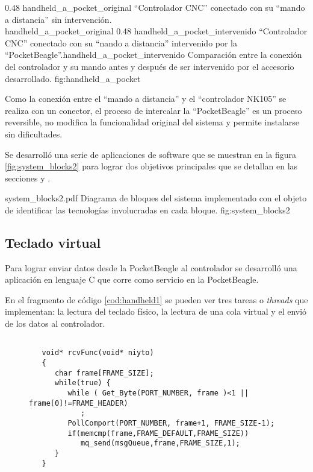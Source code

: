 \subfigab 
   {0.48} {handheld_a_pocket_original} { ``Controlador CNC'' conectado con su ``mando a distancia'' sin intervención.\\ \vphantom{1}}{handheld_a_pocket_original}
   {0.48} {handheld_a_pocket_intervenido} {``Controlador CNC'' conectado con su ``nando a distancia'' intervenido por la\\ ``PocketBeagle''.}{handheld_a_pocket_intervenido}
   {Comparación entre la conexión del controlador y su mando antes y después de ser intervenido por el accesorio desarrollado.}
   {fig:handheld_a_pocket}

         Como la conexión entre el ``mando a distancia'' y el ``controlador NK105'' se realiza con un conector, el proceso de intercalar la ``PocketBeagle'' es un proceso reversible, no modifica la funcionalidad original del sistema y permite instalarse sin dificultades.\par

   Se desarrolló una serie de aplicaciones de software que se muestran en la figura \ref{fig:system_blocks2} para lograr dos objetivos principales que se detallan en las secciones \label{subsection:teclado_virtual} y \label{subsection:pantalla_virtial}.

         {system_blocks2.pdf}
         {Diagrama de bloques del sistema implementado con el objeto de identificar las tecnologías involucradas en cada bloque.}
         {fig:system_blocks2}

\subsection{Teclado virtual}
\label{subsection:teclado_virtual}

      Para lograr enviar datos desde la PocketBeagle al controlador se desarrolló una aplicación en lenguaje C que corre como servicio en la PocketBeagle.\par
      En el fragmento de código \ref{cod:handheld1} se pueden ver tres tareas o \textit{threads} que implementan: la lectura del teclado físico, la lectura de una cola virtual y el envió de los datos al controlador.\par

\begin{figure}
   \begin{lstlisting}[label={cod:handheld1},caption={Tarea encargada de procesar los datos del teclado físico y reenviarlos a la cola de multiplexado.}]

   void* rcvFunc(void* niyto)
   {
      char frame[FRAME_SIZE];
      while(true) {
         while ( Get_Byte(PORT_NUMBER, frame )<1 || frame[0]!=FRAME_HEADER)
            ;
         PollComport(PORT_NUMBER, frame+1, FRAME_SIZE-1);
         if(memcmp(frame,FRAME_DEFAULT,FRAME_SIZE))
            mq_send(msgQueue,frame,FRAME_SIZE,1);
      }
   }
   \end{lstlisting}
\end{figure}

